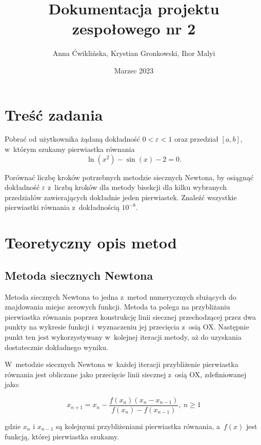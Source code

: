 \documentclass[12pt]{article}
\title{Dokumentacja projektu zespołowego nr 2}
\author{Anna Ćwiklińska, Krystian Gronkowski, Ihor Malyi}
\date{Marzec 2023}
\begin{document}
\lstset{basicstyle=\ttfamily, columns=fullflexible, upquote=true}
\renewcommand{\lstlistingname}{Listing}

\maketitle

\section{Treść zadania}
Pobrać od użytkownika żądaną dokładność $0<\varepsilon<1$ oraz przedział $[a,b]$, w~którym szukamy pierwiastka równania $$\ln(x^2) - \sin(x) - 2 = 0.$$

Porównać liczbę kroków potrzebnych metodzie siecznych Newtona, by osiągnąć dokładność $\varepsilon$ z~liczbą kroków dla metody bisekcji dla kilku wybranych przedziałów zawierających dokładnie jeden pierwiastek. Znaleźć wszystkie pierwiastki równania z~dokładnością $10^{-8}$.

\section{Teoretyczny opis metod}
\subsection{Metoda siecznych Newtona}
Metoda siecznych Newtona to jedna z~metod numerycznych służących do znajdowania miejsc zerowych funkcji. Metoda ta polega na przybliżaniu pierwiastka równania poprzez konstrukcję linii siecznej przechodzącej przez dwa punkty na wykresie funkcji i~wyznaczeniu jej przecięcia z~osią OX. Następnie punkt ten jest wykorzystywany w~kolejnej iteracji metody, aż do uzyskania dostatecznie dokładnego wyniku.

W~metodzie siecznych Newtona w~każdej iteracji przybliżenie pierwiastka równania jest obliczane jako przecięcie linii siecznej z~osią OX, zdefiniowanej jako:

$$x_{n+1} = x_n - \frac{f(x_n)(x_n-x_{n-1})}{f(x_n)-f(x_{n-1})},\ n\geq1$$

gdzie $x_n$ i $x_{n-1}$ są kolejnymi przybliżeniami pierwiastka równania, a~$f(x)$ jest funkcją, której pierwiastka szukamy.
\end{document}
